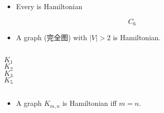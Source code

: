 
\begin{frame}{}
\end{frame}

\begin{frame}{}
  \begin{exampleblock}{}
    \begin{itemize}
      \item Every  is Hamiltonian
    \end{itemize}
  \end{exampleblock}

  \vspace{0.60cm}
  \[
    C_{6}
  \]
\end{frame}

\begin{frame}{}
  \begin{exampleblock}{}
    \begin{itemize}
      \item A  graph (完全图) with $|V| > 2$ is Hamiltonian.
    \end{itemize}
  \end{exampleblock}

  \pause
  \vspace{0.60cm}
  \begin{columns}
      \[
        K_{1}
      \]
      \[
        K_{2}
      \]
      \[
        K_{3}
      \]
      \[
        K_{5}
      \]
  \end{columns}
\end{frame}

\begin{frame}{}
  \begin{exampleblock}{}
    \begin{itemize}
      \item A  graph $K_{m, n}$ is Hamiltonian
        iff $m = n$.
    \end{itemize}
  \end{exampleblock}
\end{frame}

